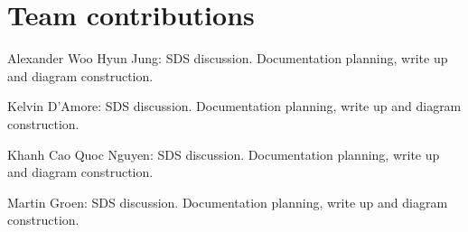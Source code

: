\documentclass{article}
\begin{document}
\section{Team contributions}
\setlength\parindent{0pt} 
Alexander Woo Hyun Jung: SDS discussion. Documentation planning, write up and  diagram construction.

Kelvin D'Amore: SDS discussion. Documentation planning, write up and  diagram construction. 

Khanh Cao Quoc Nguyen: SDS discussion. Documentation planning, write up and  diagram construction. 

Martin Groen: SDS discussion. Documentation planning, write up and  diagram construction. 
\end{document}
